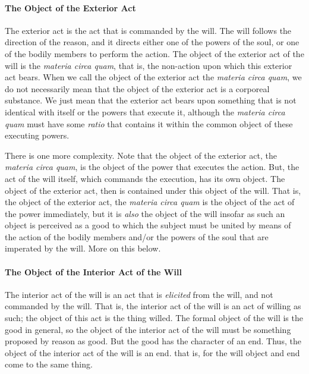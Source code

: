 \documentclass{article}
\begin{document}
\paragraph*{The Object of the Exterior Act}

The exterior act is the act that is commanded by the will.  The will
follows the direction of the reason, and it directs either one of the powers of the soul, or one of the bodily members
to perform the action.  The object of the exterior act of the will is the \emph{materia circa quam}, that is, the
non-action upon which this exterior act bears.  When we call the object of the exterior act the \emph{materia circa
quam}, we do not necessarily mean that the object of the exterior act is a corporeal substance.  We just mean that the
exterior act bears upon something that is not identical with itself or the powers that execute it, although the
\emph{materia circa quam} must have some \emph{ratio} that contains it within the common object of these executing
powers.

There is one more complexity.  Note that the object of the exterior act, the \emph{materia circa quam}, is the object of
the power that executes the action.  But, the act of the will itself, which commands the execution, has its own object.
The object of the exterior act, then is contained under this object of the will.  That is, the object of the exterior
act, the \emph{materia circa quam} is the object of the act of the power immediately, but it is \emph{also} the object 
of the will insofar as such an object is perceived as a good to which the subject must be united by means of the action
of the bodily members and/or the powers of the soul that are imperated by the will.  More on this below.

\paragraph*{The Object of the Interior Act of the Will}

The interior act of the will is an act that is \emph{elicited} from the will, and not commanded by the will.  That is,
the interior act of the will is an act of willing as such; the object of this act is the thing willed.  The formal
object of the will is the good in general, so the object of the interior act of the will must be something proposed by
reason as good.  But the good has the character of an end.  Thus, the object of the interior act of the will is an end.
that is, for the will object and end come to the same thing.  
\end{document}
